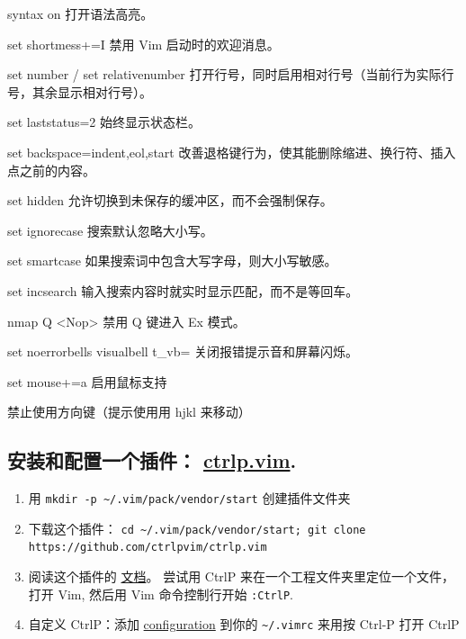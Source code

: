 \documentclass[a4paper, 12pt]{article}
\begin{document}
syntax on
打开语法高亮。

set shortmess+=I
禁用 Vim 启动时的欢迎消息。

set number / set relativenumber
打开行号，同时启用相对行号（当前行为实际行号，其余显示相对行号）。

set laststatus=2
始终显示状态栏。

set backspace=indent,eol,start
改善退格键行为，使其能删除缩进、换行符、插入点之前的内容。

set hidden
允许切换到未保存的缓冲区，而不会强制保存。

set ignorecase
搜索默认忽略大小写。

set smartcase
如果搜索词中包含大写字母，则大小写敏感。

set incsearch
输入搜索内容时就实时显示匹配，而不是等回车。

nmap Q <Nop>
禁用 Q 键进入 Ex 模式。

set noerrorbells visualbell t\_vb=
关闭报错提示音和屏幕闪烁。

set mouse+=a
启用鼠标支持

禁止使用方向键（提示使用用 hjkl 来移动）
\subsection{安装和配置一个插件： \href{https://github.com/ctrlpvim/ctrlp.vim}{ctrlp.vim}. }

\begin{enumerate}
    \item 用 \verb|mkdir -p ~/.vim/pack/vendor/start| 创建插件文件夹
    \item 下载这个插件： \verb|cd ~/.vim/pack/vendor/start; git clone https://github.com/ctrlpvim/ctrlp.vim|
    \item 阅读这个插件的 \href{https://github.com/ctrlpvim/ctrlp.vim/blob/master/readme.md}{文档}。 尝试用 CtrlP 来在一个工程文件夹里定位一个文件，打开 Vim, 然后用 Vim 命令控制行开始 \verb|:CtrlP|.
    \item 自定义 CtrlP：添加 \href{https://github.com/ctrlpvim/ctrlp.vim/blob/master/readme.md\#basic-options}{configuration} 到你的 \verb|~/.vimrc| 来用按 Ctrl-P 打开 CtrlP
\end{enumerate}
\end{document}
